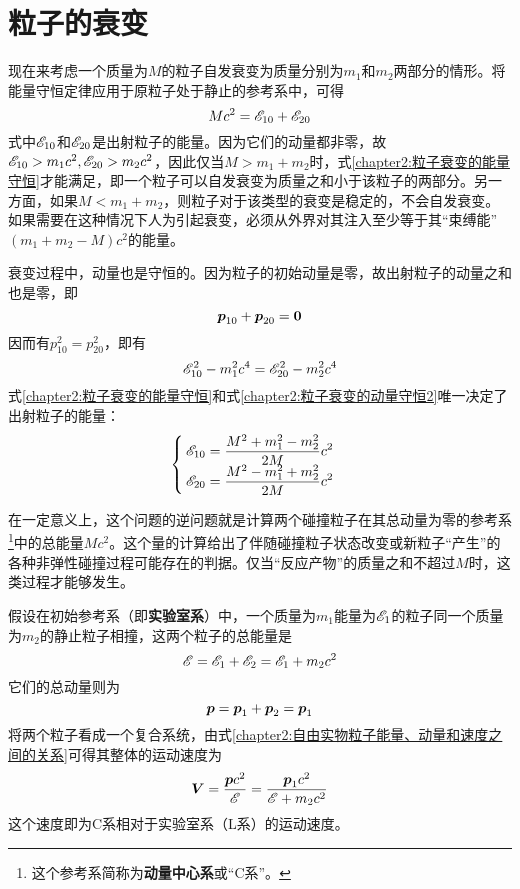 \section{粒子的衰变}

现在来考虑一个质量为$M$的粒子自发衰变为质量分别为$m_1$和$m_2$两部分的情形。将能量守恒定律应用于原粒子处于静止的参考系中，可得
\begin{equation}
	Mc^2 = \mathscr{E}_{10}+\mathscr{E}_{20}
	\label{chapter2:粒子衰变的能量守恒}
\end{equation}
式中$\mathscr{E}_{10}$和$\mathscr{E}_{20}$是出射粒子的能量。因为它们的动量都非零，故$\mathscr{E}_{10} > m_1c^2, \mathscr{E}_{20} > m_2c^2$，因此仅当$M>m_1+m_2$时，式\eqref{chapter2:粒子衰变的能量守恒}才能满足，即一个粒子可以自发衰变为质量之和小于该粒子的两部分。另一方面，如果$M<m_1+m_2$，则粒子对于该类型的衰变是稳定的，不会自发衰变。如果需要在这种情况下人为引起衰变，必须从外界对其注入至少等于其“束缚能”$(m_1+m_2-M)c^2$的能量。

衰变过程中，动量也是守恒的。因为粒子的初始动量是零，故出射粒子的动量之和也是零，即
\begin{equation}
	\boldsymbol{p}_{10}+\boldsymbol{p}_{20} = \boldsymbol{0}
	\label{chapter2:粒子衰变的动量守恒1}
\end{equation}
因而有$p_{10}^2=p_{20}^2$，即有
\begin{equation}
	\mathscr{E}_{10}^2-m_1^2c^4 = \mathscr{E}_{20}^2-m_2^2c^4
	\label{chapter2:粒子衰变的动量守恒2}
\end{equation}
式\eqref{chapter2:粒子衰变的能量守恒}和式\eqref{chapter2:粒子衰变的动量守恒2}唯一决定了出射粒子的能量：
\begin{equation}
\begin{cases}
	\displaystyle \mathscr{E}_{10} = \frac{M^2+m_1^2-m_2^2}{2M}c^2 \\
	\displaystyle \mathscr{E}_{20} = \frac{M^2-m_1^2+m_2^2}{2M}c^2
\end{cases}
\end{equation}

在一定意义上，这个问题的逆问题就是计算两个碰撞粒子在其总动量为零的参考系\footnote{这个参考系简称为{\bf 动量中心系}或“C系”。}中的总能量$Mc^2$。这个量的计算给出了伴随碰撞粒子状态改变或新粒子“产生”的各种非弹性碰撞过程可能存在的判据。仅当“反应产物”的质量之和不超过$M$时，这类过程才能够发生。

假设在初始参考系（即{\bf 实验室系}）中，一个质量为$m_1$能量为$\mathscr{E}_1$的粒子同一个质量为$m_2$的静止粒子相撞，这两个粒子的总能量是
\begin{equation*}
	\mathscr{E} = \mathscr{E}_1+\mathscr{E}_2 = \mathscr{E}_1 + m_2c^2
\end{equation*}
它们的总动量则为
\begin{equation*}
	\boldsymbol{p} = \boldsymbol{p}_1+\boldsymbol{p}_2 = \boldsymbol{p}_1
\end{equation*}
将两个粒子看成一个复合系统，由式\eqref{chapter2:自由实物粒子能量、动量和速度之间的关系}可得其整体的运动速度为
\begin{equation}
	\boldsymbol{V} = \frac{\boldsymbol{p}c^2}{\mathscr{E}} = \frac{\boldsymbol{p}_1c^2}{\mathscr{E}+m_2c^2}
\end{equation}
这个速度即为C系相对于实验室系（L系）的运动速度。

